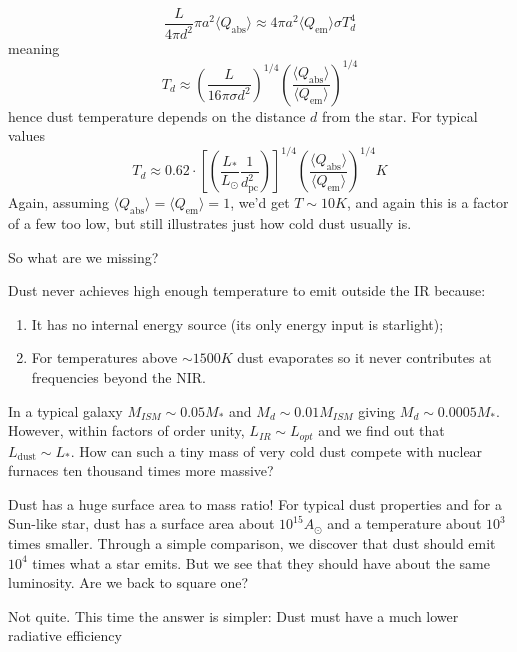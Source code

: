 \begin{equation*}
    \frac{L}{4\pi d^{2}}\pi a^{2}\langle Q_{\text{abs}} \rangle \approx 4\pi a^{2} \langle Q_{\text{em}} \rangle\sigma T_{d}^{4}
\end{equation*}
meaning 
\begin{equation*}
    T_{d} \approx \left(\frac{L}{16\pi\sigma d^{2}}\right)^{1/4}\left(\frac{\langle Q_{\text{abs}} \rangle}{\langle Q_{\text{em}} \rangle}\right)^{1/4}
\end{equation*}
hence dust temperature depends on the distance $d$ from the star. For typical values 
\begin{equation*}
    T_{d} \approx 0.62\cdot\left[\left(\frac{L_{*}}{L_{\odot}}\frac{1}{d_{\text{pc}}^{2}}\right)\right]^{1/4}\left(\frac{\langle Q_{\text{abs}} \rangle}{\langle Q_{\text{em}} \rangle}\right)^{1/4}\unit{K}
\end{equation*}
Again, assuming $\langle Q_{\text{abs}} \rangle = \langle Q_{\text{em}} \rangle = 1$, we'd get $T\sim 10\unit{K}$, and again this is a factor of a few too low, but still illustrates just how cold dust usually is.
\par So what are we missing?
\par Dust never achieves high enough temperature to emit outside the IR because:
\begin{enumerate}
    \item It has no internal energy source (its only energy input is starlight);
    \item For temperatures above $\sim 1500\unit{K}$ dust evaporates so it never contributes at frequencies beyond the NIR.
\end{enumerate}
In a typical galaxy $M_{ISM}\sim 0.05M_{*}$ and $M_{d} \sim 0.01M_{ISM}$ giving $M_{d}\sim 0.0005M_{*}$. However, within factors of order unity, $L_{IR}\sim L_{opt}$ and we find out that $L_{\text{dust}}\sim L_{*}$. How can such a tiny mass of very cold dust compete with nuclear furnaces ten thousand times more massive?
\par Dust has a huge surface area to mass ratio! For typical dust properties and for a Sun-like star, dust has a surface area about $10^{15}A_{\odot}$ and a temperature about $10^{3}$ times smaller. Through a simple comparison, we discover that dust should emit $10^{4}$ times what a star emits. But we see that they should have about the same luminosity. Are we back to square one?
\par Not quite. This time the answer is simpler: Dust must have a much lower radiative efficiency
